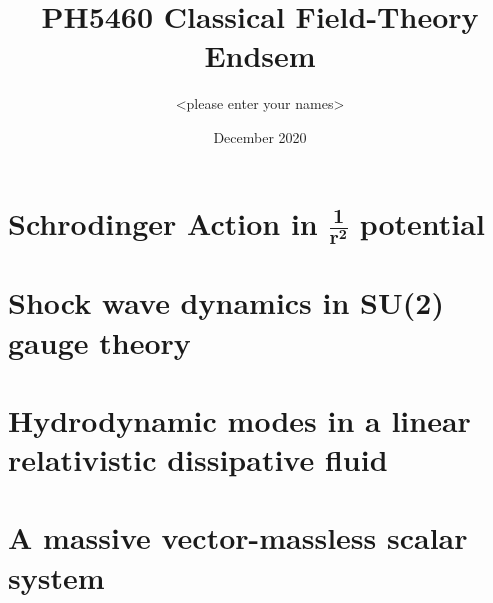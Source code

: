 \documentclass{article}
\title{PH5460 Classical Field-Theory Endsem}
\author{<please enter your names>}
\date{December 2020}
\begin{document}
\maketitle

\section{Schrodinger Action in $\mathbf{\frac{1}{r^2}}$ potential}

\section{Shock wave dynamics in SU(2) gauge theory}

\section{Hydrodynamic modes in a linear relativistic dissipative fluid}

\section{A massive vector-massless scalar system}
\end{document}
